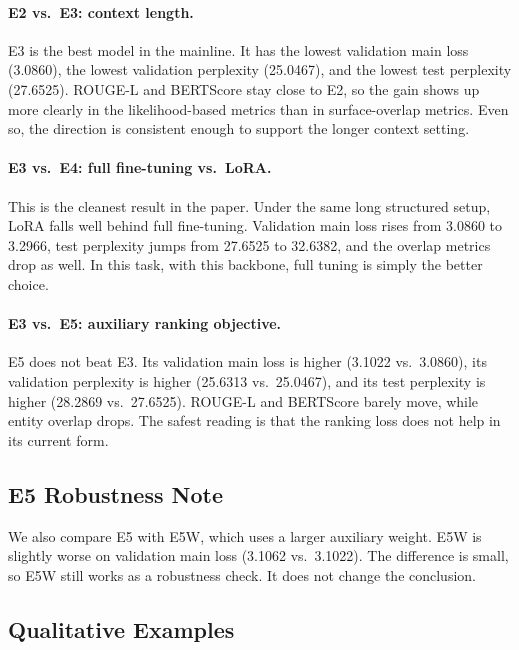 \documentclass{article}
\newcommand{\expid}[1]{\textsc{#1}}
\begin{document}
\paragraph{\expid{E2} vs.\ \expid{E3}: context length.}
\expid{E3} is the best model in the mainline. It has the lowest validation main loss (3.0860), the lowest validation perplexity (25.0467), and the lowest test perplexity (27.6525). ROUGE-L and BERTScore stay close to \expid{E2}, so the gain shows up more clearly in the likelihood-based metrics than in surface-overlap metrics. Even so, the direction is consistent enough to support the longer context setting.

\paragraph{\expid{E3} vs.\ \expid{E4}: full fine-tuning vs.\ LoRA.}
This is the cleanest result in the paper. Under the same long structured setup, LoRA falls well behind full fine-tuning. Validation main loss rises from 3.0860 to 3.2966, test perplexity jumps from 27.6525 to 32.6382, and the overlap metrics drop as well. In this task, with this backbone, full tuning is simply the better choice.

\paragraph{\expid{E3} vs.\ \expid{E5}: auxiliary ranking objective.}
\expid{E5} does not beat \expid{E3}. Its validation main loss is higher (3.1022 vs.\ 3.0860), its validation perplexity is higher (25.6313 vs.\ 25.0467), and its test perplexity is higher (28.2869 vs.\ 27.6525). ROUGE-L and BERTScore barely move, while entity overlap drops. The safest reading is that the ranking loss does not help in its current form.

\subsection{\expid{E5} Robustness Note}

We also compare \expid{E5} with \expid{E5W}, which uses a larger auxiliary weight. \expid{E5W} is slightly worse on validation main loss (3.1062 vs.\ 3.1022). The difference is small, so \expid{E5W} still works as a robustness check. It does not change the conclusion.

\subsection{Qualitative Examples}
\end{document}
